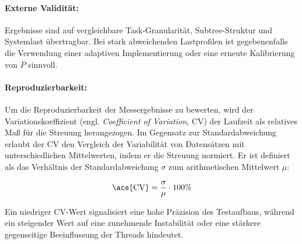 \begin{sloppypar}
\paragraph{Externe Validität:}
Ergebnisse sind auf vergleichbare Task-Granularität, Subtree-Struktur und Systemlast übertragbar. 
Bei stark abweichenden Lastprofilen ist gegebenenfalls die Verwendung einer adaptiven 
Implementierung oder eine erneute Kalibrierung von $P$ sinnvoll.


\paragraph{Reproduzierbarkeit:}
Um die Reproduzierbarkeit der Messergebnisse zu bewerten, wird der Variationskoeffizient (engl. \textit{Coefficient of Variation}, \acs{CV}) der Laufzeit als relatives Maß für die Streuung herangezogen. Im Gegensatz zur Standardabweichung erlaubt der \acs{CV} den Vergleich der Variabilität von Datensätzen mit unterschiedlichen Mittelwerten, indem er die Streuung normiert. Er ist definiert als das Verhältnis der Standardabweichung $\sigma$ zum arithmetischen Mittelwert $\mu$:

\begin{equation}
    \text{\acs{CV}} = \frac{\sigma}{\mu} \cdot 100\%
\end{equation}

\noindent Ein niedriger \acs{CV}-Wert signalisiert eine hohe Präzision des Testaufbaus, während ein steigender Wert auf eine zunehmende Instabilität oder eine stärkere gegenseitige Beeinflussung der Threads hindeutet. 



\end{sloppypar}